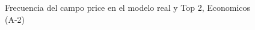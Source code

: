 \begin{figure}[H]
    \centering
    
    \caption{Frecuencia del campo  price en el modelo real y Top 2, Economicos (A-2)}
    \label{frecuency- Price-top2}
\end{figure}